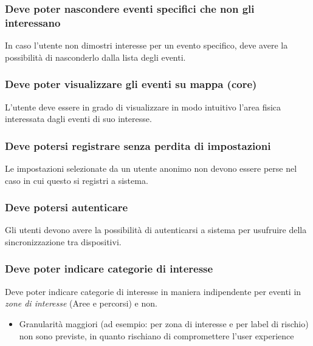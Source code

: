 \documentclass{article}
\begin{document}
\subsubsection{Deve poter nascondere eventi specifici che non gli interessano}
In caso l'utente non dimostri interesse per un evento specifico, deve avere la possibilità di nasconderlo dalla lista degli eventi.

\subsubsection{Deve poter visualizzare gli eventi su mappa (core)}
L'utente deve essere in grado di visualizzare in modo intuitivo l'area fisica interessata dagli eventi di suo interesse. 

\subsubsection{Deve potersi registrare senza perdita di impostazioni}
Le impostazioni selezionate da un utente anonimo non devono essere perse nel caso in cui questo si registri a sistema.

\subsubsection{Deve potersi autenticare}
Gli utenti devono avere la possibilità di autenticarsi a sistema per usufruire della sincronizzazione tra dispositivi.

\subsubsection{Deve poter indicare categorie di interesse}
Deve poter indicare categorie di interesse in maniera indipendente per eventi in \textit{zone di interesse} (Aree e percorsi) e non.
\begin{itemize}
    \item Granularità maggiori (ad esempio: per zona di interesse e per label di rischio) non sono previste, in quanto rischiano di compromettere l'user experience
\end{itemize}
\end{document}
